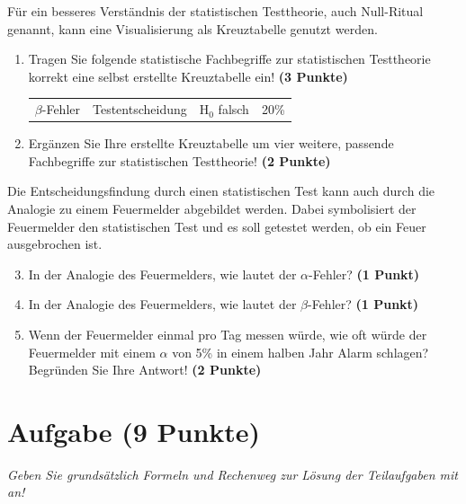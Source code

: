 \documentclass[a4paper, 9pt]{scrartcl}\usepackage[]{graphicx}\usepackage[]{xcolor}
\begin{document}
F{\"u}r ein besseres Verst{\"a}ndnis der statistischen Testtheorie, auch
Null-Ritual genannt, kann eine Visualisierung als Kreuztabelle genutzt werden.  

\begin{enumerate}
\item Tragen Sie folgende statistische Fachbegriffe zur statistischen
  Testtheorie korrekt eine selbst erstellte Kreuztabelle ein! \textbf{(3
    Punkte)}
  \begin{center}
  \begin{tabular}{cccc}
  $\beta$-Fehler & Testentscheidung & H$_0$ falsch & 20\% \\
  \end{tabular}
  \end{center}
\item Erg{\"a}nzen Sie Ihre erstellte Kreuztabelle um vier weitere, passende
  Fachbegriffe zur statistischen Testtheorie! \textbf{(2 Punkte)}
\end{enumerate}

Die Entscheidungsfindung durch einen statistischen Test kann auch durch die
Analogie zu einem Feuermelder abgebildet werden. Dabei symbolisiert der
Feuermelder den statistischen Test und es soll getestet werden, ob ein Feuer
ausgebrochen ist.

\begin{enumerate}
  \setcounter{enumi}{2}    
\item In der Analogie des Feuermelders, wie lautet der $\alpha$-Fehler? \textbf{(1 Punkt)}
\item In der Analogie des Feuermelders, wie lautet der $\beta$-Fehler? \textbf{(1 Punkt)}
\item Wenn der Feuermelder einmal pro Tag messen w{\"u}rde, wie oft w{\"u}rde der
  Feuermelder mit einem $\alpha$ von 5\% in einem halben Jahr Alarm schlagen?
  Begr{\"u}nden Sie Ihre Antwort! \textbf{(2 Punkte)}
\end{enumerate}



 
\clearpage

\section{Aufgabe \hfill (9 Punkte)}

\textit{Geben Sie grunds{\"a}tzlich Formeln und Rechenweg zur L{\"o}sung der
  Teilaufgaben mit an!} \\[1Ex]
\end{document}
